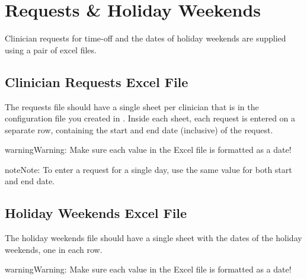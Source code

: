\documentclass[letterpaper,10pt,english]{sphinxmanual}
\begin{document}
\begin{figure}[H]
\centering
{}\end{figure}


\chapter{Requests \& Holiday Weekends}
\label{\detokenize{manual:requests-holiday-weekends}}\label{\detokenize{manual:requests-and-holidays}}
Clinician requests for time-off and the dates of holiday weekends are
supplied using a pair of excel files.


\section{Clinician Requests Excel File}
\label{\detokenize{manual:clinician-requests-excel-file}}
The requests file should have a single sheet per clinician that is in the
configuration file you created in {\hyperref[\detokenize{manual:clinician-configuration}]{}}. Inside
each sheet, each request is entered on a separate row, containing the start
and end date (inclusive) of the request.

\begin{sphinxadmonition}{warning}{Warning:}
Make sure each value in the Excel file is formatted as a date!
\end{sphinxadmonition}

\begin{figure}[H]
\centering
{}\end{figure}

\begin{sphinxadmonition}{note}{Note:}
To enter a request for a single day, use the same value for both start
and end date.
\end{sphinxadmonition}


\section{Holiday Weekends Excel File}
\label{\detokenize{manual:holiday-weekends-excel-file}}
The holiday weekends file should have a single sheet with the dates of the
holiday weekends, one in each row.

\begin{sphinxadmonition}{warning}{Warning:}
Make sure each value in the Excel file is formatted as a date!
\end{sphinxadmonition}
\end{document}
